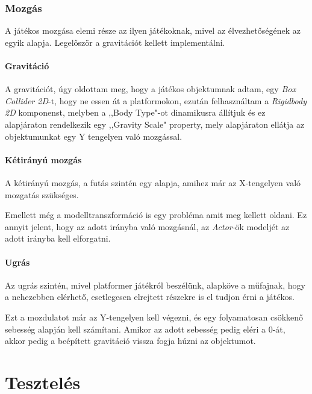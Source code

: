 \documentclass[]{thesis-ekf}
\theoremstyle{definition}
\begin{document}
	\subsection{Mozgás}
	A játékos mozgása elemi része az ilyen játékoknak, mivel az élvezhetőségének az egyik alapja.
	Legelőször a gravitációt kellett implementálni.
	\subsubsection{Gravitáció}
	A gravitációt, úgy oldottam meg, hogy a játékos objektumnak adtam, egy \emph{Box Collider 2D}-t, hogy ne essen át a platformokon, ezután felhasználtam a \emph{Rigidbody 2D} komponenst, melyben a ,,Body Type"-ot dinamikusra állítjuk és ez alapjáraton rendelkezik egy ,,Gravity Scale" property, mely alapjáraton ellátja az objektumunkat egy Y tengelyen való mozgással.
	
	\subsubsection{Kétirányú mozgás}
	A kétirányú mozgás, a futás szintén egy alapja, amihez már az X-tengelyen való mozgatás szükséges.
	
	Emellett még a modelltranszformáció is egy probléma amit meg kellett oldani. Ez annyit jelent, hogy az adott irányba való mozgásnál, az \emph{Actor}-ök modeljét az adott irányba kell elforgatni.
	
	\subsubsection{Ugrás}
	Az ugrás szintén, mivel platformer játékról beszélünk, alapköve a műfajnak, hogy a nehezebben elérhető, esetlegesen elrejtett részekre is el tudjon érni a játékos.
	
	Ezt a mozdulatot már az Y-tengelyen kell végezni, és egy folyamatosan csökkenő sebesség alapján kell számítani. Amikor az adott sebesség pedig eléri a 0-át, akkor pedig a beépített gravitáció vissza fogja húzni az objektumot.
	
	\chapter{Tesztelés}
	
\end{document}
